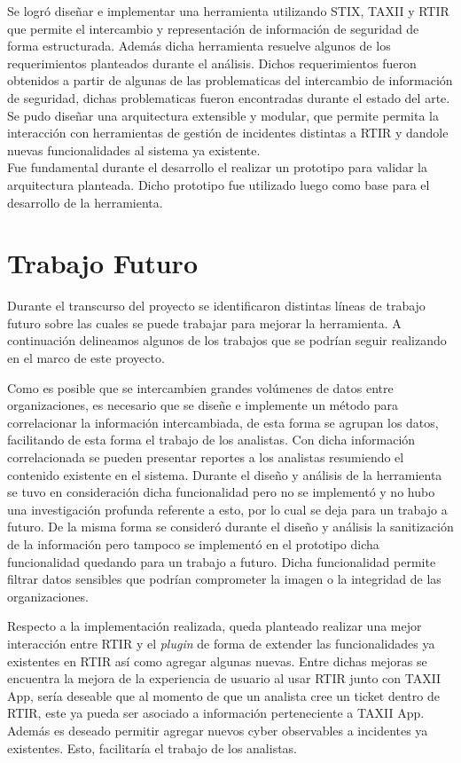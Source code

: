 \bigskip
Se logró diseñar e implementar una herramienta utilizando STIX, TAXII y RTIR que permite el intercambio y representación de información de seguridad de forma estructurada. Además dicha herramienta resuelve algunos de los requerimientos planteados durante el análisis. Dichos requerimientos fueron obtenidos a partir de algunas de las problematicas del intercambio de información de seguridad, dichas problematicas fueron encontradas durante el estado del arte.\\
Se pudo diseñar una arquitectura extensible y modular, que permite permita la interacción con herramientas de gestión de incidentes distintas a RTIR y dandole nuevas funcionalidades al sistema ya existente.\\
Fue fundamental durante el desarrollo el realizar un prototipo para validar la arquitectura planteada. Dicho prototipo fue utilizado luego como base para el desarrollo de la herramienta.

\section{Trabajo Futuro}
Durante el transcurso del proyecto se identificaron distintas líneas de trabajo futuro sobre las cuales se puede trabajar para mejorar la herramienta. A continuación delineamos algunos de los trabajos que se podrían seguir realizando en el marco de este proyecto.
\bigskip

Como es posible que se intercambien grandes volúmenes de datos entre organizaciones, es necesario que se diseñe e implemente un método para correlacionar la información intercambiada, de esta forma se agrupan los datos, facilitando de esta forma el trabajo de los analistas. Con dicha información correlacionada se pueden presentar reportes a los analistas resumiendo el contenido existente en el sistema. Durante el diseño y análisis de la herramienta se tuvo en consideración dicha funcionalidad pero no se implementó y no hubo una investigación profunda referente a esto, por lo cual se deja para un trabajo a futuro. 
De la misma forma se consideró durante el diseño y análisis la sanitización de la información pero tampoco se implementó en el prototipo dicha funcionalidad quedando para un trabajo a futuro.  Dicha funcionalidad permite filtrar datos sensibles que podrían comprometer la imagen o la integridad de las organizaciones.
\bigskip

Respecto a la implementación realizada, queda planteado realizar una mejor interacción entre RTIR y el \textit{plugin} de forma de extender las funcionalidades ya existentes en RTIR así como agregar algunas nuevas. Entre dichas mejoras se encuentra la mejora de la experiencia de usuario al usar RTIR junto con TAXII App, sería deseable que al momento de que un analista cree un ticket dentro de RTIR, este ya pueda ser asociado a información perteneciente a TAXII App. Además es deseado permitir agregar nuevos cyber observables a incidentes ya existentes. Esto, facilitaría el trabajo de los analistas.

